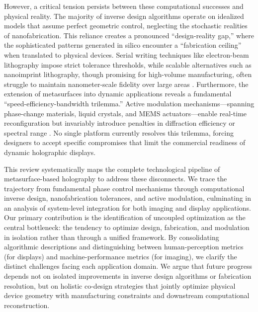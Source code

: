 However, a critical tension persists between these computational successes and physical reality. The majority of inverse design algorithms operate on idealized models that assume perfect geometric control, neglecting the stochastic realities of nanofabrication. This reliance creates a pronounced ``design-reality gap,'' where the sophisticated patterns generated in silico encounter a ``fabrication ceiling'' when translated to physical devices. Serial writing techniques like electron-beam lithography impose strict tolerance thresholds, while scalable alternatives such as nanoimprint lithography, though promising for high-volume manufacturing, often struggle to maintain nanometer-scale fidelity over large areas \citep{doi_10_3390_encyclopedia5040197_fe6bfdc9}. Furthermore, the extension of metasurfaces into dynamic applications reveals a fundamental ``speed-efficiency-bandwidth trilemma.'' Active modulation mechanisms---spanning phase-change materials, liquid crystals, and MEMS actuators---enable real-time reconfiguration but invariably introduce penalties in diffraction efficiency or spectral range \citep{doi_10_1002_lpor_71186_5fa1be75}. No single platform currently resolves this trilemma, forcing designers to accept specific compromises that limit the commercial readiness of dynamic holographic displays.

This review systematically maps the complete technological pipeline of metasurface-based holography to address these disconnects. We trace the trajectory from fundamental phase control mechanisms through computational inverse design, nanofabrication tolerances, and active modulation, culminating in an analysis of system-level integration for both imaging and display applications. Our primary contribution is the identification of uncoupled optimization as the central bottleneck: the tendency to optimize design, fabrication, and modulation in isolation rather than through a unified framework. By consolidating algorithmic descriptions and distinguishing between human-perception metrics (for displays) and machine-performance metrics (for imaging), we clarify the distinct challenges facing each application domain. We argue that future progress depends not on isolated improvements in inverse design algorithms or fabrication resolution, but on holistic co-design strategies that jointly optimize physical device geometry with manufacturing constraints and downstream computational reconstruction.

